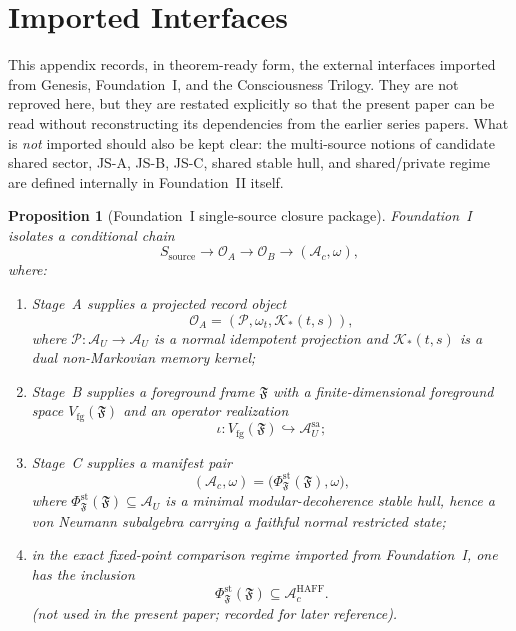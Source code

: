 \documentclass[12pt]{article}
\newtheorem{proposition}[theorem]{Proposition}
\theoremstyle{definition}
\theoremstyle{remark}
\begin{document}
\appendix

\section{Imported Interfaces}
\label{app:premises}

This appendix records, in theorem-ready form, the external interfaces
imported from Genesis, Foundation~I, and the Consciousness Trilogy. They
are not reproved here, but they are restated explicitly so that the
present paper can be read without reconstructing its dependencies from
the earlier series papers. What is \emph{not} imported should also be
kept clear: the multi-source notions of candidate shared sector, JS-A,
JS-B, JS-C, shared stable hull, and shared/private regime are defined
internally in Foundation~II itself.

\begin{proposition}[Foundation~I single-source closure package]
\label{prop:appF1}
Foundation~I~\cite{FoundationI} isolates a conditional chain
\[
S_{\mathrm{source}}
\to
\mathcal O_A
\to
\mathcal O_B
\to
(\mathcal A_c,\omega),
\]
where:
\begin{enumerate}
\item Stage~A supplies a projected record object
  \[
  \mathcal O_A=(\mathcal P,\omega_t,\mathcal K_*(t,s)),
  \]
  where \(\mathcal P:\mathcal A_U\to\mathcal A_U\) is a normal
  idempotent projection and \(\mathcal K_*(t,s)\) is a dual
  non-Markovian memory kernel;
\item Stage~B supplies a foreground frame \(\mathfrak F\) with a
  finite-dimensional foreground space
  \(V_{\mathrm{fg}}(\mathfrak F)\) and an operator realization
  \[
  \iota:V_{\mathrm{fg}}(\mathfrak F)\hookrightarrow \mathcal A_U^{\mathrm{sa}};
  \]
\item Stage~C supplies a manifest pair
  \[
  (\mathcal A_c,\omega)
  =
  \bigl(\Phi_{\mathfrak F}^{\mathrm{st}}(\mathfrak F),\omega\bigr),
  \]
  where \(\Phi_{\mathfrak F}^{\mathrm{st}}(\mathfrak F)\subseteq
  \mathcal A_U\) is a minimal modular-decoherence stable hull, hence a
  von Neumann subalgebra carrying a faithful normal restricted state;
\item in the exact fixed-point comparison regime imported from
  Foundation~I, one has the inclusion
  \[
  \Phi_{\mathfrak F}^{\mathrm{st}}(\mathfrak F)
  \subseteq
  \mathcal A_c^{\mathrm{HAFF}}.
  \]
  (not used in the present paper; recorded for later reference).
\end{enumerate}
\end{proposition}
\end{document}
